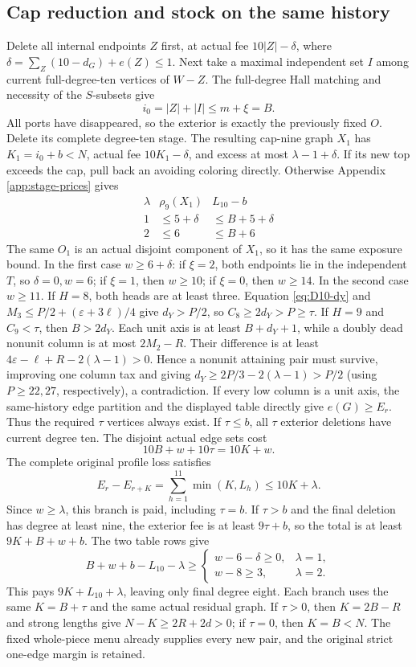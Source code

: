 \documentclass[11pt,a4paper]{article}
\theoremstyle{definition}
\begin{document}
\subsection{Cap reduction and stock on the same history}
Delete all internal endpoints $Z$ first, at actual fee $10|Z|-\delta$, where
$\delta=\sum_Z(10-d_G)+e(Z)\le1$. Next take a maximal independent set $I$ among current full-degree-ten vertices of $W-Z$. The full-degree Hall matching and necessity of the $S$-subsets give
\[
 i_0=|Z|+|I|\le m+\xi=B.
\]
All ports have disappeared, so the exterior is exactly the previously fixed $O$. Delete its complete degree-ten stage. The resulting cap-nine graph $X_1$ has $K_1=i_0+b<N$, actual fee $10K_1-\delta$, and excess at most $\lambda-1+\delta$. If its new top exceeds the cap, pull back an avoiding coloring directly. Otherwise Appendix \ref{app:stage-prices} gives
\[
 \begin{array}{c|c|c}
 \lambda&\rho_9(X_1)& L_{10}-b\\ \hline
 1&\le5+\delta&\le B+5+\delta\\
 2&\le6&\le B+6
 \end{array}
\]
The same $O_1$ is an actual disjoint component of $X_1$, so it has the same exposure bound. In the first case $w\ge6+\delta$: if $\xi=2$, both endpoints lie in the independent $T$, so $\delta=0,w=6$; if $\xi=1$, then $w\ge10$; if $\xi=0$, then $w\ge14$. In the second case $w\ge11$.
If $H=8$, both heads are at least three. Equation \eqref{eq:D10-dy} and $M_3\le P/2+(\varepsilon+3\ell)/4$ give $d_Y>P/2$, so $C_8\ge2d_Y>P\ge\tau$. If $H=9$ and $C_9<\tau$, then $B>2d_Y$. Each unit axis is at least $B+d_Y+1$, while a doubly dead nonunit column is at most $2M_2-R$. Their difference is at least $4\varepsilon-\ell+R-2(\lambda-1)>0$. Hence a nonunit attaining pair must survive, improving one column tax and giving $d_Y\ge2P/3-2(\lambda-1)>P/2$ (using $P\ge22,27$, respectively), a contradiction. If every low column is a unit axis, the same-history edge partition and the displayed table directly give $e(G)\ge E_r$. Thus the required $\tau$ vertices always exist. If $\tau\le b$, all $\tau$ exterior deletions have current degree ten. The disjoint actual edge sets cost
\[
10B+w+10\tau=10K+w.
\]
The complete original profile loss satisfies
\[
E_r-E_{r+K}=\sum_{h=1}^{11}\min(K,L_h)\le10K+\lambda.
\]
Since $w\ge\lambda$, this branch is paid, including $\tau=b$. If $\tau>b$ and the final deletion has degree at least nine, the exterior fee is at least $9\tau+b$, so the total is at least $9K+B+w+b$. The two table rows give
\[
B+w+b-L_{10}-\lambda\ge
\begin{cases}
w-6-\delta\ge0,&\lambda=1,\\
w-8\ge3,&\lambda=2.
\end{cases}
\]
This pays $9K+L_{10}+\lambda$, leaving only final degree eight. Each branch uses the same $K=B+\tau$ and the same actual residual graph. If $\tau>0$, then $K=2B-R$ and strong lengths give $N-K\ge2R+2d>0$; if $\tau=0$, then $K=B<N$. The fixed whole-piece menu already supplies every new pair, and the original strict one-edge margin is retained.
\end{document}
